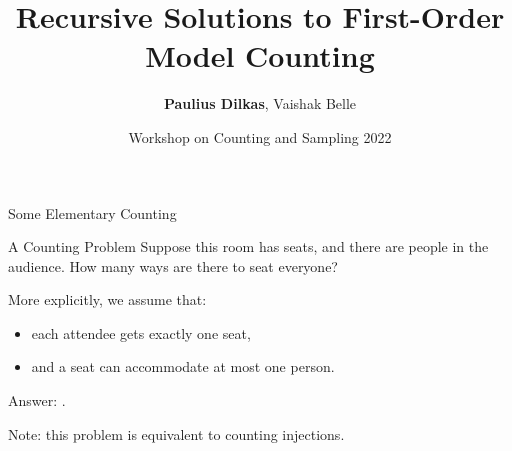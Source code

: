 \documentclass{beamer}
\author{\textbf{Paulius Dilkas}, Vaishak Belle}
\title{Recursive Solutions to First-Order Model Counting}
\institute{University of Edinburgh, UK}
\date{Workshop on Counting and Sampling 2022}
\begin{document}

\begin{frame}
  \titlepage
\end{frame}

\begin{frame}{Some Elementary Counting}
  \begin{exampleblock}{A Counting Problem}
    Suppose this room has  seats, and there are
     people in the audience. How many ways are there to
    seat everyone?
  \end{exampleblock}

  \pause
  More explicitly, we assume that:
  \begin{itemize}
  \item each attendee gets exactly one seat,
  \item and a seat can accommodate at most one person.
  \end{itemize}

  \pause
  \alert{Answer:} .

  Note: this problem is equivalent to counting \structure{$[m] \to [n]$} injections.

\end{frame}
\end{document}
